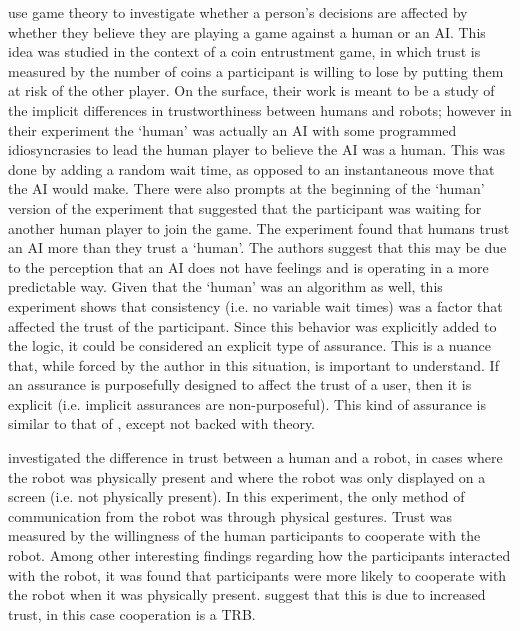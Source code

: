 \citet{Wu2016-ei} use game theory to investigate whether a person's decisions are affected by whether they believe they are playing a game against a human or an AI. This idea was studied in the context of a coin entrustment game, in which trust is measured by the number of coins a participant is willing to lose by putting them at risk of the other player. On the surface, their work is meant to be a study of the implicit differences in trustworthiness between humans and robots; however in their experiment the `human' was actually an AI with some programmed idiosyncrasies to lead the human player to believe the AI was a human. This was done by adding a random wait time, as opposed to an instantaneous move that the AI would make. There were also prompts at the beginning of the `human' version of the experiment that suggested that the participant was waiting for another human player to join the game. The experiment found that humans trust an AI more than they trust a `human'. The authors suggest that this may be due to the perception that an AI does not have feelings and is operating in a more predictable way. Given that the `human' was an algorithm as well, this experiment shows that consistency (i.e. no variable wait times) was a factor that affected the trust of the participant. Since this behavior was explicitly added to the logic, it could be considered an explicit type of assurance. This is a nuance that, while forced by the author in this situation, is important to understand. If an assurance is purposefully designed to affect the trust of a user, then it is explicit (i.e. implicit assurances are non-purposeful). This kind of assurance is similar to that of \citeauthor{Dragan2013-wd}, except not backed with theory.

\citet{Bainbridge2011-pl} investigated the difference in trust between a human and a robot, in cases where the robot was physically present and where the robot was only displayed on a screen (i.e. not physically present). In this experiment, the only method of communication from the robot was through physical gestures. Trust was measured by the willingness of the human participants to cooperate with the robot. Among other interesting findings regarding how the participants interacted with the robot, it was found that participants were more likely to cooperate with the robot when it was physically present. \citeauthor{Bainbridge2011-pl} suggest that this is due to increased trust, in this case cooperation is a TRB.

